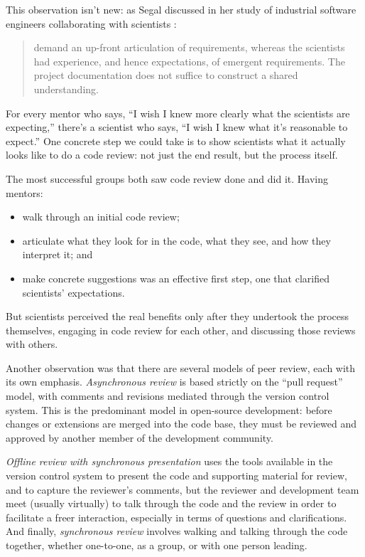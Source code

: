\documentclass[10pt,twocolumn]{article}
\begin{document}
This observation isn't new:
as Segal discussed in her study of industrial software engineers collaborating with scientists \cite{b:segal2005}:

\begin{quotation}
\noindent
[Programmers] demand an up-front articulation of requirements,
whereas the scientists had experience, and hence expectations, of emergent requirements.
The project documentation does not suffice to construct a shared understanding.
\end{quotation}

For every mentor who says,
``I wish I knew more clearly what the scientists are expecting,''
there's a scientist who says,
``I wish I knew what it's reasonable to expect.''
One concrete step we could take is to show scientists what it actually looks like to do a code review:
not just the end result, but the process itself.

The most successful groups both saw code review done and did it.
Having mentors:

\begin{itemize}

\item walk through an initial code review;
\item articulate what they look for in the code, what they see, and how they interpret it; and
\item make concrete suggestions was an effective first step, one that clarified scientists' expectations.

\end{itemize}

But scientists perceived the real benefits only after they undertook the process themselves,
engaging in code review for each other,
and discussing those reviews with others.

Another observation was that there are several models of peer review,
each with its own emphasis.
\emph{Asynchronous review}
is based strictly on the ``pull request'' model,
with comments and revisions mediated through the version control system.
This is the predominant model in open-source development:
before changes or extensions are merged into the code base,
they must be reviewed and approved by another member of the development community. 

\emph{Offline review with synchronous presentation}
uses the tools available in the version control system to present the code and supporting material for review,
and to capture the reviewer’s comments,
but the reviewer and development team meet (usually virtually) to talk through the code and the review
in order to facilitate a freer interaction,
especially in terms of questions and clarifications.
And finally,
\emph{synchronous review}
involves walking and talking through the code together,
whether one-to-one, as a group, or with one person leading.
\end{document}
